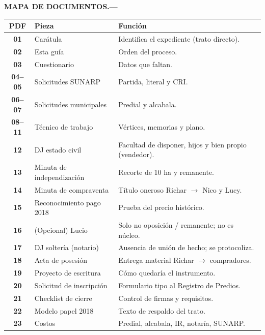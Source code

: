 \documentclass[12pt,a4paper]{article}
\begin{document}
\par\vspace{0.55em}
\noindent
\begin{minipage}[t]{0.24\linewidth}
\raggedright\textbf{\MakeUppercase{Mapa de documentos}.---}
\end{minipage}\hfill
\begin{minipage}[t]{0.74\linewidth}
{\footnotesize\renewcommand{\arraystretch}{1.12}
\noindent\begin{tabularx}{\linewidth}{@{} >{\bfseries}c >{\raggedright\arraybackslash}p{3.15cm} >{\raggedright\arraybackslash}X @{}}
\toprule
PDF & Pieza & Función \\
\midrule
01 & Carátula & Identifica el expediente (trato directo). \\
02 & Esta guía & Orden del proceso. \\
03 & Cuestionario & Datos que faltan. \\
04--05 & Solicitudes SUNARP & Partida, literal y CRI. \\
06--07 & Solicitudes municipales & Predial y alcabala. \\
08--11 & Técnico de trabajo & Vértices, memorias y plano. \\
12 & DJ estado civil & Facultad de disponer, hijos y bien propio (vendedor). \\
13 & Minuta de independización & Recorte de 10 ha y remanente. \\
14 & Minuta de compraventa & Título oneroso Richar $\rightarrow$ Nico y Lucy. \\
15 & Reconocimiento pago 2018 & Prueba del precio histórico. \\
16 & (Opcional) Lucio & Solo no oposición / remanente; no es núcleo. \\
17 & DJ soltería (notario) & Ausencia de unión de hecho; se protocoliza. \\
18 & Acta de posesión & Entrega material Richar $\rightarrow$ compradores. \\
19 & Proyecto de escritura & Cómo quedaría el instrumento. \\
20 & Solicitud de inscripción & Formulario tipo al Registro de Predios. \\
21 & Checklist de cierre & Control de firmas y requisitos. \\
22 & Modelo papel 2018 & Texto de respaldo del trato. \\
23 & Costos & Predial, alcabala, IR, notaría, SUNARP. \\
\bottomrule
\end{tabularx}}
\end{minipage}
\par
\end{document}
